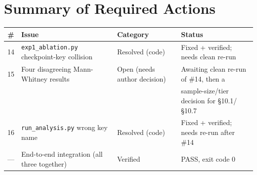 \documentclass[11pt]{article}
\begin{document}
\section*{Summary of Required Actions}
\begin{center}
\small
\begin{tabular}{clll}
\toprule
\# & Issue & Category & Status \\
\midrule
14 & \texttt{exp1\_ablation.py} checkpoint-key collision & Resolved (code) & Fixed + verified; needs clean re-run \\
15 & Four disagreeing Mann-Whitney results & Open (needs author decision) & Awaiting clean re-run of \#14, then a \\
   & & & sample-size/tier decision for \S10.1/\S10.7 \\
16 & \texttt{run\_analysis.py} wrong key name & Resolved (code) & Fixed + verified; needs re-run after \#14 \\
--- & End-to-end integration (all three together) & Verified & PASS, exit code 0 \\
\bottomrule
\end{tabular}
\end{center}
\end{document}
